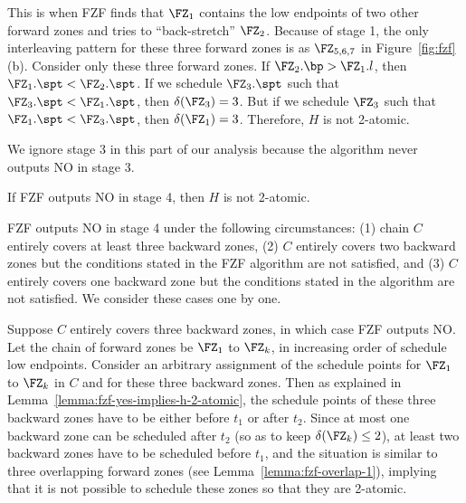 {\proof This is when FZF finds that $\FZ_1$ contains the low endpoints
of two other forward zones and tries to ``back-stretch'' $\FZ_2$.
Because of stage 1, the only interleaving pattern for these three
forward zones is as $\FZ_{5,6,7}$ in Figure~\ref{fig:fzf}(b).
Consider only these three forward zones.  If $\FZ_2.\bp > \FZ_1.l$,
then $\FZ_1.\spt < \FZ_2.\spt$.  If we schedule $\FZ_3.\spt$ such that
$\FZ_3.\spt < \FZ_1.\spt$, then $\delta(\FZ_3)=3$.  But if we schedule
$\FZ_3$ such that $\FZ_1.\spt < \FZ_3.\spt$, then $\delta(\FZ_1) = 3$.
Therefore, $H$ is not 2-atomic.  \QED

We ignore stage 3 in this part of our analysis because the algorithm
never outputs NO in stage 3.

\begin{lemma}
  \label{lemma:fzf-no-3}
  If FZF outputs NO in stage 4, then $H$ is not 2-atomic.
\end{lemma}

\proof FZF outputs NO in stage 4 under the following circumstances:
(1) chain $C$ entirely covers at least three backward zones, (2) $C$
entirely covers two backward zones but the conditions stated in the
FZF algorithm are not satisfied, and (3) $C$ entirely covers one
backward zone but the conditions stated in the algorithm are not
satisfied.  We consider these cases one by one.

Suppose $C$ entirely covers three backward zones, in which case FZF
outputs NO.  Let the chain of forward zones be $\FZ_1$ to $\FZ_k$, in
increasing order of schedule low endpoints.  Consider an arbitrary
assignment of the schedule points for $\FZ_1$ to $\FZ_k$ in $C$ and
for these three backward zones.  Then as explained in
Lemma~\ref{lemma:fzf-yes-implies-h-2-atomic}, the schedule points of
these three backward zones have to be either before $t_1$ or after
$t_2$.  Since at most one backward zone can be scheduled after $t_2$
(so as to keep $\delta(\FZ_k) \leq 2$), at least two backward zones
have to be scheduled before $t_1$, and the situation is similar to
three overlapping forward zones (see Lemma~\ref{lemma:fzf-overlap-1}),
implying that it is not possible to schedule these zones so that they
are 2-atomic.

}

